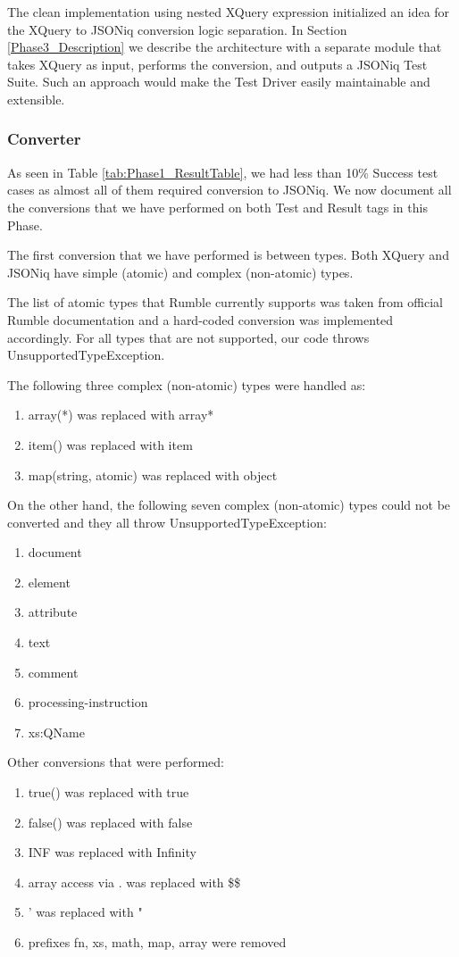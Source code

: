 The clean implementation using nested XQuery expression initialized an idea for the XQuery to JSONiq conversion logic separation. In Section \ref{Phase3_Description} we describe the architecture with a separate module that takes XQuery as input, performs the conversion, and outputs a JSONiq Test Suite. Such an approach would make the Test Driver easily maintainable and extensible.

\subsubsection{Converter}
\label{Phase2_Converter}
As seen in Table \ref{tab:Phase1_ResultTable}, we had less than 10\% Success test cases as almost all of them required conversion to JSONiq. We now document all the conversions that we have performed on both Test and Result tags in this Phase. 

The first conversion that we have performed is between types. Both XQuery and JSONiq have simple (atomic) and complex (non-atomic) types. 

The list of atomic types that Rumble currently supports was taken from official Rumble documentation \cite{RumbleSupportedTypes} and a hard-coded conversion was implemented accordingly. For all types that are not supported, our code throws UnsupportedTypeException. 

The following three complex (non-atomic) types were handled as:
\begin{enumerate}
	\item array(*) was replaced with array*
	\item item() was replaced with item
	\item map(string, atomic) was replaced with object 
\end{enumerate}

On the other hand, the following seven complex (non-atomic) types could not be converted and they all throw UnsupportedTypeException:
\begin{enumerate}
	\item document
	\item element
	\item attribute
	\item text
	\item comment
	\item processing-instruction
	\item xs:QName
\end{enumerate}

Other conversions that were performed:
\begin{enumerate}
	\item true() was replaced with true
	\item false() was replaced with false
	\item INF was replaced with Infinity
	\item array access via . was replaced with \$\$
	\item ' was replaced with "
	\item prefixes fn, xs, math, map, array were removed
\end{enumerate}

